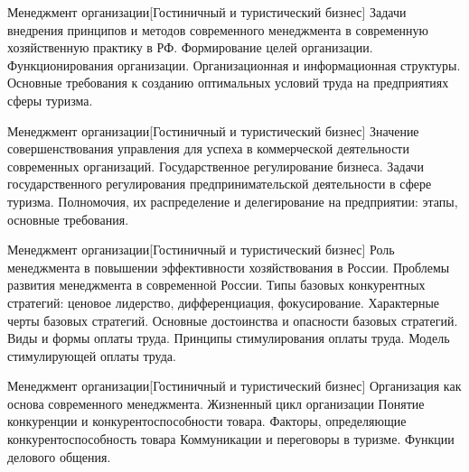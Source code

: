 \documentclass[
	11pt,
	a4paper,
	]
	{article}
\begin{document}
	

\begin{minipage}[t][\miniH]{\miniL}\centering
	 {Менеджмент организации}[Гостиничный и туристический бизнес]
		{
			Задачи внедрения принципов и методов современного менеджмента в современную хозяйственную практику в РФ.
		}{
			Формирование целей организации. Функционирования организации. Организационная и информационная структуры.
		}{
			Основные требования к созданию оптимальных условий труда на предприятиях сферы туризма.
		}
	\lowGE
\end{minipage}

\vfill



\begin{minipage}[t][\miniH]{\miniL}\centering
	 {Менеджмент организации}[Гостиничный и туристический бизнес]
		{
			Значение совершенствования управления для успеха в коммерческой деятельности современных организаций.
		}{
			Государственное регулирование бизнеса. Задачи государственного регулирования предпринимательской деятельности в сфере туризма.
		}{
			Полномочия, их распределение и делегирование на предприятии: этапы, основные требования.
		}
	\lowGE
\end{minipage}

\vfill



\begin{minipage}[t][\miniH]{\miniL}\centering
	 {Менеджмент организации}[Гостиничный и туристический бизнес]
		{
			Роль менеджмента в повышении эффективности хозяйствования в России. Проблемы развития менеджмента в современной России.
		}{
			Типы базовых конкурентных стратегий: ценовое лидерство, дифференциация, фокусирование. Характерные черты базовых стратегий. Основные достоинства и опасности базовых стратегий.
		}{
			Виды и формы оплаты труда. Принципы стимулирования оплаты труда. Модель стимулирующей оплаты труда.
		}
	\lowGE
\end{minipage}





\begin{minipage}[t][\miniH]{\miniL}\centering
	 {Менеджмент организации}[Гостиничный и туристический бизнес]
		{
			Организация как основа современного менеджмента. Жизненный цикл организации
		}{
			Понятие конкуренции и конкурентоспособности товара. Факторы, определяющие конкурентоспособность товара
		}{
			Коммуникации и переговоры в туризме. Функции делового общения.
		}
	\lowGE
\end{minipage}
\end{document}
